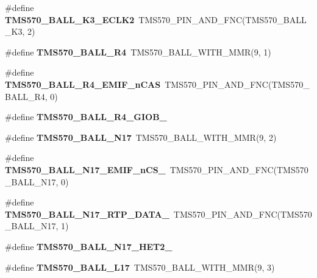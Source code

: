 \begin{DoxyCompactItemize}
\#define {\bfseries T\+M\+S570\+\_\+\+B\+A\+L\+L\+\_\+\+K3\+\_\+\+E\+C\+L\+K2}~T\+M\+S570\+\_\+\+P\+I\+N\+\_\+\+A\+N\+D\+\_\+\+F\+NC(T\+M\+S570\+\_\+\+B\+A\+L\+L\+\_\+\+K3, 2)
\item 
\mbox{\label{tms570lc4357-pins_8h_a5f1db36ede1b207e471bc0fded84a8a6}} 
\#define {\bfseries T\+M\+S570\+\_\+\+B\+A\+L\+L\+\_\+\+R4}~T\+M\+S570\+\_\+\+B\+A\+L\+L\+\_\+\+W\+I\+T\+H\+\_\+\+M\+MR(9, 1)
\item 
\mbox{\label{tms570lc4357-pins_8h_adfd36cc28d3718661de40dbf5800a51a}} 
\#define {\bfseries T\+M\+S570\+\_\+\+B\+A\+L\+L\+\_\+\+R4\+\_\+\+E\+M\+I\+F\+\_\+n\+C\+AS}~T\+M\+S570\+\_\+\+P\+I\+N\+\_\+\+A\+N\+D\+\_\+\+F\+NC(T\+M\+S570\+\_\+\+B\+A\+L\+L\+\_\+\+R4, 0)
\item 
\#define {\bfseries T\+M\+S570\+\_\+\+B\+A\+L\+L\+\_\+\+R4\+\_\+\+G\+I\+O\+B\+\_}
\item 
\mbox{\label{tms570lc4357-pins_8h_af656f3dd46093de3265995e4f61e23eb}} 
\#define {\bfseries T\+M\+S570\+\_\+\+B\+A\+L\+L\+\_\+\+N17}~T\+M\+S570\+\_\+\+B\+A\+L\+L\+\_\+\+W\+I\+T\+H\+\_\+\+M\+MR(9, 2)
\item 
\mbox{\label{tms570lc4357-pins_8h_a878b9434f109d0fab84aa23f7b3cde25}} 
\#define {\bfseries T\+M\+S570\+\_\+\+B\+A\+L\+L\+\_\+\+N17\+\_\+\+E\+M\+I\+F\+\_\+n\+C\+S\+\_}~T\+M\+S570\+\_\+\+P\+I\+N\+\_\+\+A\+N\+D\+\_\+\+F\+NC(T\+M\+S570\+\_\+\+B\+A\+L\+L\+\_\+\+N17, 0)
\item 
\mbox{\label{tms570lc4357-pins_8h_a127775dd743701f844b10fcbc059601f}} 
\#define {\bfseries T\+M\+S570\+\_\+\+B\+A\+L\+L\+\_\+\+N17\+\_\+\+R\+T\+P\+\_\+\+D\+A\+T\+A\+\_}~T\+M\+S570\+\_\+\+P\+I\+N\+\_\+\+A\+N\+D\+\_\+\+F\+NC(T\+M\+S570\+\_\+\+B\+A\+L\+L\+\_\+\+N17, 1)
\item 
\#define {\bfseries T\+M\+S570\+\_\+\+B\+A\+L\+L\+\_\+\+N17\+\_\+\+H\+E\+T2\+\_}
\item 
\mbox{\label{tms570lc4357-pins_8h_a7c4457bb170afa4215d303e4f19d7c00}} 
\#define {\bfseries T\+M\+S570\+\_\+\+B\+A\+L\+L\+\_\+\+L17}~T\+M\+S570\+\_\+\+B\+A\+L\+L\+\_\+\+W\+I\+T\+H\+\_\+\+M\+MR(9, 3)
\item 
\mbox{\label{tms570lc4357-pins_8h_a141152808b3d4139394bed472dd1f8bb}} 

\end{DoxyCompactItemize}
